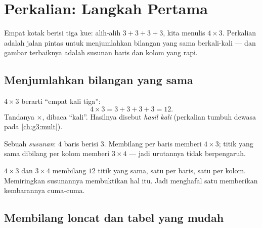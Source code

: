\chapter{Perkalian: Langkah Pertama}\label{ch:g2:mult}

Empat kotak berisi tiga kue: alih-alih $3 + 3 + 3 + 3$, kita menulis
$4 \times 3$. Perkalian adalah jalan pintas untuk menjumlahkan
bilangan yang sama berkali-kali --- dan gambar terbaiknya adalah
susunan baris dan kolom yang rapi.

\section{Menjumlahkan bilangan yang sama}

\begin{definition}[Perkalian]\label{def:g2:mult:def}
$4 \times 3$ berarti ``empat kali tiga'':
\[
4 \times 3 = 3 + 3 + 3 + 3 = 12 .
\]
Tandanya $\times$, dibaca ``kali''. Hasilnya disebut \emph{hasil
kali} (perkalian tumbuh dewasa pada \cref{ch:g3:mult}).
\end{definition}

\begin{omfigure}

{\small Sebuah \emph{susunan}: $4$ baris berisi $3$. Membilang per
baris memberi $4 \times 3$; titik yang sama dibilang per kolom
memberi $3 \times 4$ --- jadi urutannya tidak berpengaruh.}
\end{omfigure}

\begin{example}\label{ex:g2:mult:order}
$4 \times 3$ dan $3 \times 4$ membilang $12$ titik yang sama, satu
per baris, satu per kolom. Memiringkan susunannya membuktikan hal
itu. Jadi menghafal satu  memberikan kembarannya cuma-cuma.
\end{example}

\section{Membilang loncat dan tabel yang mudah}


